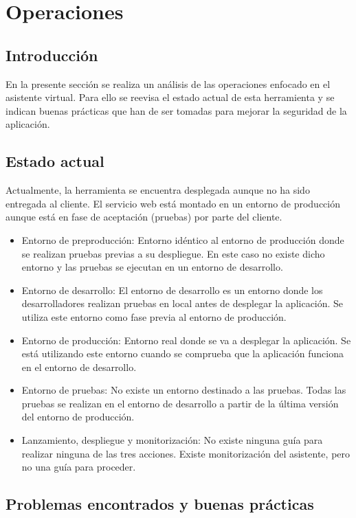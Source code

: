 \chapter{Operaciones}
\label{chap:operations}

\section{Introducción}

En la presente sección se realiza un análisis de las operaciones enfocado en el asistente virtual. Para ello se reevisa el estado actual de esta herramienta y se indican buenas prácticas que han de ser tomadas para mejorar la seguridad de la aplicación.


\section{Estado actual}

Actualmente, la herramienta se encuentra desplegada aunque no ha sido entregada al cliente. El servicio web está montado en un entorno de producción aunque está en fase de aceptación (pruebas) por parte del cliente.
\begin{itemize}
    \item Entorno de preproducción: Entorno idéntico al entorno de producción donde se realizan pruebas previas a su despliegue. En este caso no existe dicho entorno y las pruebas se ejecutan en un entorno de desarrollo.
    \item Entorno de desarrollo: El entorno de desarrollo es un entorno donde los desarrolladores realizan pruebas en local antes de desplegar la aplicación. Se utiliza este entorno como fase previa al entorno de producción.
    \item Entorno de producción: Entorno real donde se va a desplegar la aplicación. Se está utilizando este entorno cuando se comprueba que la aplicación funciona en el entorno de desarrollo.
    \item Entorno de pruebas: No existe un entorno destinado a las pruebas. Todas las pruebas se realizan en el entorno de desarrollo a partir de la última versión del entorno de producción.
    \item Lanzamiento, despliegue y monitorización: No existe ninguna guía para realizar ninguna de las tres acciones. Existe monitorización del asistente, pero no una guía para proceder.
\end{itemize}

\section{Problemas encontrados y buenas prácticas}


